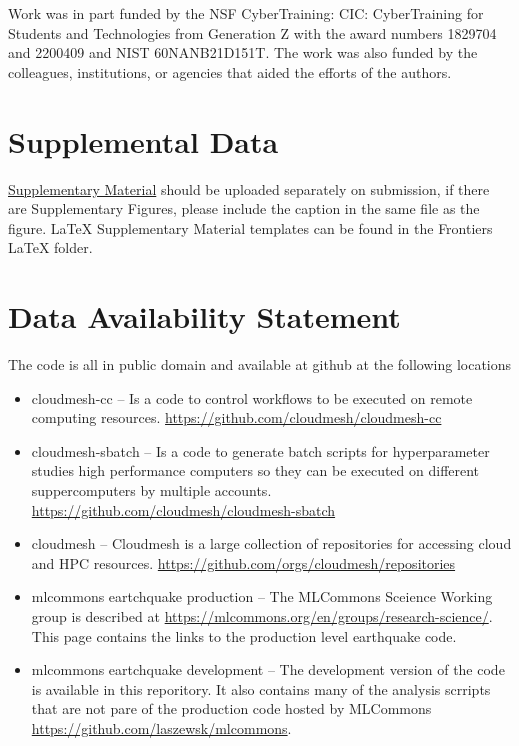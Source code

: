 \documentclass[utf8]{FrontiersinVancouver} %
\newcommand{\TODO}[1]{\todo[inline]{#1}}
\begin{document}
Work was in part funded by the NSF CyberTraining: CIC:
CyberTraining for Students and Technologies from Generation Z with the
award numbers 1829704 and 2200409 and NIST 60NANB21D151T. 
The work was also funded by the \TODO{Department of Energy under the
  grant ???.}
colleagues, institutions, or agencies that aided the efforts of the
authors.

\section*{Supplemental Data}

\href{https://www.frontiersin.org/guidelines/author-guidelines#supplementary-material}{Supplementary
  Material} should be uploaded separately on submission, if there are
Supplementary Figures, please include the caption in the same file as
the figure. LaTeX Supplementary Material templates can be found in the
Frontiers LaTeX folder.

\section*{Data Availability Statement}

The code is all in public domain and available at github at the following locations

\begin{itemize}

\item cloudmesh-cc -- Is a code to control workflows to be executed on
  remote computing
  resources. \url{https://github.com/cloudmesh/cloudmesh-cc}

\item cloudmesh-sbatch -- Is a code to generate batch scripts for
  hyperparameter studies high performance computers so they can be
  executed on different suppercomputers by multiple
  accounts. \url{https://github.com/cloudmesh/cloudmesh-sbatch}

\item cloudmesh -- Cloudmesh is a large collection of repositories for
  accessing cloud and HPC
  resources. \url{https://github.com/orgs/cloudmesh/repositories}

\item mlcommons eartchquake production -- The MLCommons Sceience
  Working group is described at
  \url{https://mlcommons.org/en/groups/research-science/}. This page
  contains the links to the production level earthquake code.

\item mlcommons eartchquake development -- The development version of
  the code is available in this reporitory. It also contains many of
  the analysis scrripts that are not pare of the production code
  hosted by MLCommons \url{https://github.com/laszewsk/mlcommons}.
  
\end{itemize}
\end{document}
